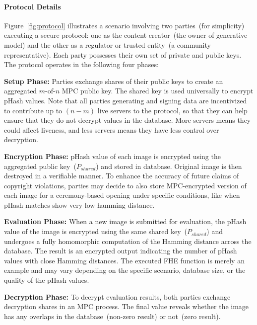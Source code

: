 \paragraph{\textbf{Protocol Details}}
Figure~\ref{fig:protocol} illustrates a scenario involving two parties~(for simplicity) executing a secure protocol: one as the content creator~(the owner of generative model) and the other as a regulator or trusted entity~(a community representative). Each party possesses their own set of private and public keys. The protocol operates in the following four phases:
\begin{compactitem}[-]
    \item \textbf{Setup Phase:} Parties exchange shares of their public keys to create an aggregated $m\mbox{-of-}n$ MPC public key. The shared key is used universally to encrypt pHash values. Note that all parties generating and signing data are incentivized to contribute up to $(n - m)$ live servers to the protocol, so that they can help ensure that they do not decrypt values in the database. More servers means they could affect liveness, and less servers means they have less control over decryption. 
    
    \item \textbf{Encryption Phase:} pHash value of each image is encrypted using the aggregated public key~($P_{shared}$) and stored in database. Original image is then destroyed in a verifiable manner.
    To enhance the accuracy of future claims of copyright violations, parties may decide to also store MPC-encrypted version of each image for a ceremony-based opening under specific conditions, like when pHash matches show very low hamming distance. 
    
    \item \textbf{Evaluation Phase:} When a new image is submitted for evaluation, the pHash value of the image is encrypted using the same shared key~($P_{shared}$) and undergoes a fully homomorphic computation of the Hamming distance across the database. The result is an encrypted output indicating the number of pHash values with close Hamming distances.
    The executed FHE function is merely an example and may vary depending on the specific scenario, database size, or the quality of the pHash values. 
    
    \item \textbf{Decryption Phase:} To decrypt evaluation results, both parties exchange decryption shares in an MPC process. The final value reveals whether the image has any overlaps in the database~(non-zero result) or not~(zero result).
\end{compactitem}

